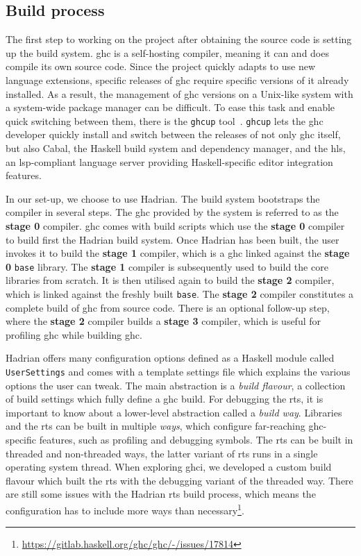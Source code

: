 \documentclass[thesis=B,english]{FITthesis}[2019/12/23]
\newcommand{\hackage}[1]{\texttt{#1}}
\newcommand{\hsModule}[1]{\texttt{#1}}
\begin{document}
\subsection*{Build process}
The first step to working on the project after obtaining the source code is
setting up the build system. \acrshort{ghc} is a self-hosting compiler, meaning
it can and does compile its own source code. Since the project quickly adapts
to use new language extensions, specific releases of \acrshort{ghc} require
specific versions of it already installed. As a result, the management of
\acrshort{ghc} versions on a Unix-like system with a system-wide package
manager can be difficult. To ease this task and enable quick switching between
them, there is the \texttt{ghcup} tool~\cite{ghcup}. \texttt{ghcup} lets the
\acrshort{ghc} developer quickly install and switch between the releases of not
only \acrshort{ghc} itself, but also Cabal, the Haskell build system and
dependency manager, and the \acrfull{hls}, an \acrshort{lsp}-compliant language
server providing Haskell-specific editor integration features.

In our set-up, we choose to use Hadrian. The build system bootstraps the
compiler in several steps. The \acrshort{ghc} provided by the system is
referred to as the \textbf{stage 0} compiler. \acrshort{ghc} comes with build
scripts which use the \textbf{stage 0} compiler to build first the Hadrian
build system. Once Hadrian has been built, the user invokes it to build the
\textbf{stage 1} compiler, which is a \acrshort{ghc} linked against the
\textbf{stage 0} \hackage{base} library. The \textbf{stage 1} compiler is
subsequently used to build the core libraries from scratch. It is then utilised
again to build the \textbf{stage 2} compiler, which is linked against the
freshly built \hackage{base}. The \textbf{stage 2} compiler constitutes a
complete build of \acrshort{ghc} from source code. There is an optional
follow-up step, where the \textbf{stage 2} compiler builds a \textbf{stage 3}
compiler, which is useful for profiling \acrshort{ghc} while building
\acrshort{ghc}.

Hadrian offers many configuration options defined as a Haskell module called
\hsModule{UserSettings} and comes with a template settings file which explains
the various options the user can tweak. The main abstraction is a \textit{build
flavour}, a collection of build settings which fully define a \acrshort{ghc}
build. For debugging the \acrshort{rts}, it is important to know about a
lower-level abstraction called a \textit{build way}. Libraries and the
\acrshort{rts} can be built in multiple \textit{ways}, which configure
far-reaching \acrshort{ghc}-specific features, such as profiling and debugging
symbols. The \acrshort{rts} can be built in threaded and non-threaded ways, the
latter variant of \acrshort{rts} runs in a single operating system thread. When
exploring \acrshort{ghci}, we developed a custom build flavour which built the
\acrshort{rts} with the debugging variant of the threaded way. There are still
some issues with the Hadrian \acrshort{rts} build process, which means the
configuration has to include more ways than necessary\footnote{
	\url{https://gitlab.haskell.org/ghc/ghc/-/issues/17814}
}.
\end{document}
